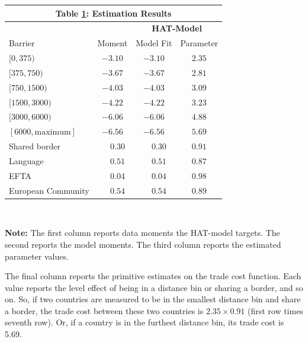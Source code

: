 \documentclass[12pt,pdftex]{article}
\renewcommand{\arraystretch}{1.1}
\begin{document}
\begin{onehalfspacing}
\begin{table}[t]
\small
\begin{center}
\setlength {\tabcolsep}{5.5mm}
\renewcommand{\arraystretch}{1.50}\label{tb-grav-est}
\begin{tabular}[t]{l c c c}
\multicolumn{4}{c}{{\normalsize\textbf{Table \ref{tb-grav-est}: Estimation Results}} }
\\\hline \hline
& & \multicolumn{2}{c}{\textbf{HAT-Model}}  \\
\cmidrule(lr){3-4}
Barrier& Moment & Model Fit & Parameter \\
\hline $[0,375)$                &$-3.10 $           & $-3.10 $              & $2.35$           \\
$[375,750)$                     &$-3.67 $           & $-3.67 $              & $2.81$           \\
$[750,1500)$                    &$-4.03 $           & $-4.03 $              & $3.09$           \\
$[1500,3000)$                   &$-4.22 $           & $-4.22 $              & $3.23$           \\
$[3000,6000)$                   &$-6.06 $           & $-6.06 $              & $4.88$           \\
$[6000,\mbox{maximum}]$         &$-6.56 $           & $-6.56 $              & $5.69$           \\
Shared border                   &$\phantom{-}0.30$  & $\phantom{-}0.30$     & $0.91$  \\
Language                        &$\phantom{-}0.51$  & $\phantom{-}0.51$     & $0.87$  \\
EFTA                            &$\phantom{-}0.04$  & $\phantom{-}0.04$     & $0.98$  \\
European Community              &$\phantom{-}0.54$  & $\phantom{-}0.54$     & $0.89$  \\
\hline
\end{tabular}
\\[0.5ex]
\parbox{5.0in}{\footnotesize \textbf{Note:} The first column reports data moments the HAT-model targets. The second reports the model moments. The third column reports the estimated parameter values.}
\end{center}
\end{table}

The final column reports the primitive estimates on the trade cost function. Each value reports the level effect of being in a distance bin or sharing a border, and so on.  So, if two countries are measured to be in the smallest distance bin and share a border, the trade cost between these two countries is $2.35 \times 0.91$ (first row times seventh row). Or, if a country is in the furthest distance bin, its trade cost is 5.69.


\end{onehalfspacing}
\end{document}
